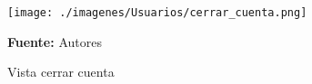 \begin{figure}[!htb]
  \begin{center}
\texttt{[image: ./imagenes/Usuarios/cerrar\_cuenta.png]}
    \caption{Vista cerrar cuenta}
    \label{fig:Vista_cerrar_cuenta}
    \textbf{Fuente:}  Autores
  \end{center}
\end{figure}
